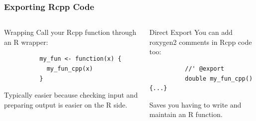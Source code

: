 \documentclass[aspectratio=1610,onlytextwidth]{beamer}
\begin{document}
\begin{frame}[c,fragile]
  \frametitle{Exporting Rcpp Code}
  \begin{columns}[T]
    \begin{column}{0.45\textwidth}
      \begin{block}{Wrapping}
        Call your Rcpp function through an R wrapper:
        \begin{lstlisting}
          my_fun <- function(x) {
            my_fun_cpp(x)
          }
        \end{lstlisting}

        \pause

        Typically easier because checking input and preparing output is
        easier on the R side.
      \end{block}
    \end{column}\pause
    \begin{column}{0.45\textwidth}
      \begin{block}{Direct Export}
        You can add roxygen2 comments in Rcpp code too:
        \begin{lstlisting}
          //' @export
          double my_fun_cpp() {...}
        \end{lstlisting}

        \pause

        Saves you having to write and maintain an R function.
      \end{block}
    \end{column}
  \end{columns}
\end{frame}
\end{document}
